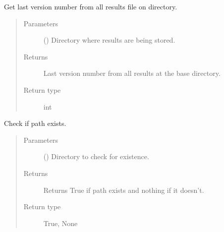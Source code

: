 \documentclass[letterpaper,10pt,english]{sphinxmanual}
\begin{document}

\begin{fulllineitems}
\label{\detokenize{source/optimization.opt_tools:optimization.opt_tools.aux_funcs.last_result}}
Get last version number from all results file on directory.
\begin{quote}\begin{description}
\item[{Parameters}] \leavevmode
{} () \textendash{} Directory where results are being stored.

\item[{Returns}] \leavevmode
Last version number from all results at the base directory.

\item[{Return type}] \leavevmode
int

\end{description}\end{quote}

\end{fulllineitems}


\begin{fulllineitems}
\label{\detokenize{source/optimization.opt_tools:optimization.opt_tools.aux_funcs.path_exists}}
Check if path exists.
\begin{quote}\begin{description}
\item[{Parameters}] \leavevmode
{} () \textendash{} Directory to check for existence.

\item[{Returns}] \leavevmode
Returns True if path exists and nothing if it doesn’t.

\item[{Return type}] \leavevmode
True, None

\end{description}\end{quote}

\end{fulllineitems}
\end{document}
